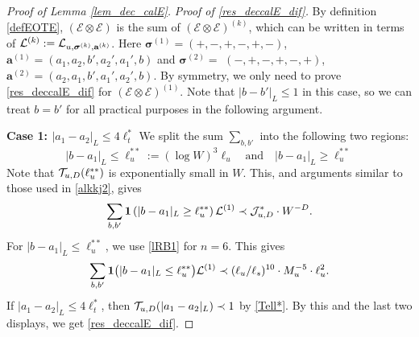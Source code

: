 \begin{proof}[Proof of Lemma \ref{lem_dec_calE}]
 \medskip
\emph{Proof of \eqref{res_deccalE_dif}. } By definition \eqref{defEOTE},  $(\mathcal{E} \otimes \mathcal{E})$ is the sum of  $(\mathcal{E} \otimes \mathcal{E})^{(k)}$, which can be written in terms of $
{\cal L}^{(k )}:= {\cal L}_{u, \boldsymbol{\sigma}^{(k ) },\textbf{a}^{(k )}} $. Here
$ \boldsymbol{\sigma}^{(1 )}=( +,-,+,-,+,-)$, $\textbf{a}^{(1 )}=( a_1,a_2, b', a_2',a_1',b)$
and $\boldsymbol{\sigma}^{( 2)}= $ $(-,+,-,+,-,+)$, $\textbf{a}^{( 2)}=( a_2,a_1, b', a_1',a_2',b)$. By symmetry, we only need to prove \eqref{res_deccalE_dif} for $(\mathcal{E} \otimes \mathcal{E})^{(1)}$. Note that $|b-b'|_{L} \leq 1$ in this case, so we can treat $b=b'$ for all practical purposes in the following argument. 

\noindent 
{\bf Case 1: $|a_1-a_2|_{L}\le 4\ell_t^*$ } 
We split the sum $\sum_{b,b'}$ into the following two regions: 
$$
|b-a_1|_{L}\le \ell_u^{** }:=(\log W)^3 \ell_u \quad\text{and}\quad |b-a_1|_{L}\ge \ell_u^{** } 
$$
Note that ${\cal T}_{u,D}(\ell_u^{** }) $ is exponentially small in $W$. This, and arguments similar to those used in \eqref{alkkj2}, gives
$$
\sum_{b,b'} {\bf 1}\left(|b-a_1|_{L}\ge \ell_u^{** }\right){\cal L}^{(1)}\prec {\cal J}^*_{u,D}\cdot W^{-D}.
$$
For $|b-a_1|_{L}\le  \ell_u^{** } $, we use \eqref{lRB1} for $n=6$. This gives
\begin{align}\label{alkkj3}
\sum_{b,b'}{\bf 1}\big(|b-a_1|_{L}\le  \ell_u^{** }\big) {\cal L}^{(1)}  \prec (\ell_u/\ell_s)^{10}\cdot M_{u}^{-5} \cdot \ell_u^{2}   .
\end{align}
If $|a_{1}-a_{2}|_{L}\leq 4\ell_{t}^{*}$, then ${\cal T}_{u,D}(|a_{1}-a_{2}|_{L})\prec1$ by \eqref{Tell*}. By this and the last two displays, we get \eqref{res_deccalE_dif}.
 \medskip



\end{proof}
